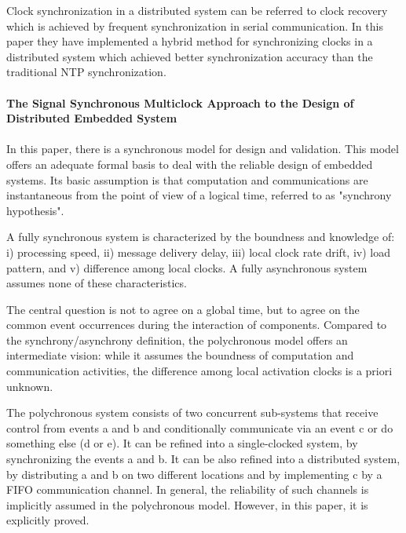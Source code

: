 \documentclass{article}
\begin{document}
Clock synchronization in a distributed system can be referred to clock recovery which is achieved by frequent synchronization in serial communication. In this paper they have implemented a hybrid method for synchronizing clocks in a distributed system which achieved better synchronization accuracy than the traditional NTP synchronization\cite{ref7}. 

\paragraph{The Signal Synchronous Multiclock Approach to the Design of Distributed Embedded System} 

\paragraph{}

In this paper, there is a synchronous model for design and validation. This model offers an adequate formal basis to deal with the reliable design of embedded systems\cite{ref8}. Its basic assumption is that computation and communications are instantaneous from the point of view of a logical time, referred to as "synchrony hypothesis". 

A fully synchronous system is characterized by the boundness and knowledge of: i) processing speed, ii) message delivery delay, iii) local clock rate drift, iv) load pattern, and v) difference among local clocks. A fully asynchronous system assumes none of these characteristics.

The central question is not to agree on a global time, but to agree on the common event occurrences during the interaction of components. Compared to the synchrony/asynchrony definition, the polychronous model offers an intermediate vision: while it assumes the boundness of computation and communication activities, the difference among local activation clocks is a priori unknown.

The polychronous system consists of two concurrent sub-systems that receive control from events a and b and conditionally communicate via an event c or do something else (d or e). It can be refined into a single-clocked system, by synchronizing the events a and b. It can be also refined into a distributed system, by distributing a and b on two different locations and by implementing c by a FIFO communication channel. In general, the reliability of such channels is implicitly assumed in the polychronous model. However, in this paper, it is explicitly proved.
\end{document}

